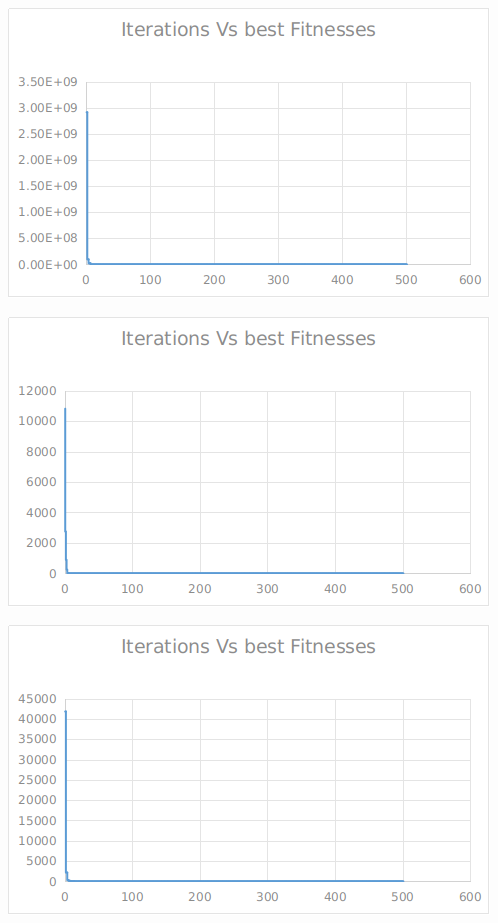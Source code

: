 \documentclass[12pt]{article}
\begin{document}
				\begin{minipage}{0.6\linewidth}
					\includegraphics[width=\linewidth]{15.png}
				\end{minipage}
				\hfill
				\begin{minipage}{0.6\linewidth}
					\includegraphics[width=\linewidth]{16.png}
				\end{minipage}
				\begin{minipage}{0.6\linewidth}
					\includegraphics[width=\linewidth]{17.png}
				\end{minipage}
\end{document}
